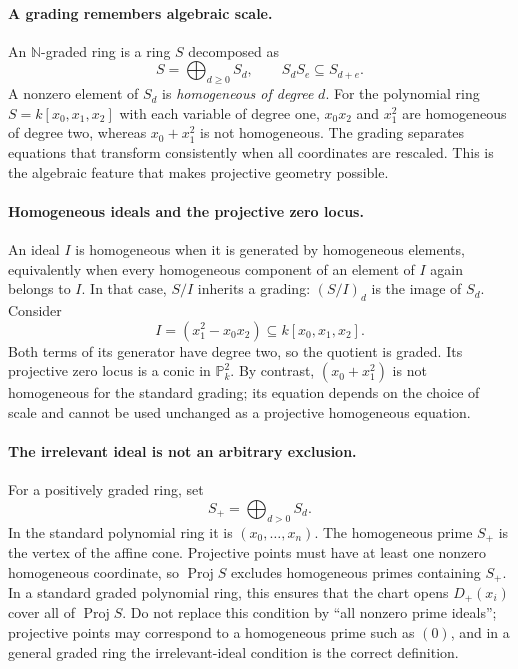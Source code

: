 \paragraph{A grading remembers algebraic scale.}
An \(\mathbb N\)-graded ring is a ring \(S\) decomposed as
\[
 S=\bigoplus_{d\geq 0} S_d,\qquad S_dS_e\subseteq S_{d+e}.
\]
A nonzero element of \(S_d\) is \emph{homogeneous of degree} \(d\).
For the polynomial ring \(S=k[x_0,x_1,x_2]\) with each variable of
degree one, \(x_0x_2\) and \(x_1^2\) are homogeneous of degree two,
whereas \(x_0+x_1^2\) is not homogeneous. The grading separates
equations that transform consistently when all coordinates are
rescaled. This is the algebraic feature that makes projective geometry
possible.

\paragraph{Homogeneous ideals and the projective zero locus.}
An ideal \(I\) is homogeneous when it is generated by homogeneous
elements, equivalently when every homogeneous component of an element
of \(I\) again belongs to \(I\). In that case, \(S/I\) inherits a
grading: \((S/I)_d\) is the image of \(S_d\). Consider
\[
 I=(x_1^2-x_0x_2)\subseteq k[x_0,x_1,x_2].
\]
Both terms of its generator have degree two, so the quotient is
graded. Its projective zero locus is a conic in \(\mathbb P^2_k\).
By contrast, \((x_0+x_1^2)\) is not homogeneous for the standard
grading; its equation depends on the choice of scale and cannot
be used unchanged as a projective homogeneous equation.

\paragraph{The irrelevant ideal is not an arbitrary exclusion.}
For a positively graded ring, set
\[
 S_+=\bigoplus_{d>0}S_d.
\]
In the standard polynomial ring it is \((x_0,\ldots,x_n)\).
The homogeneous prime \(S_+\) is the vertex of the affine cone.
Projective points must have at least one nonzero homogeneous coordinate,
so \(\operatorname{Proj}S\) excludes homogeneous primes containing
\(S_+\). In a standard graded polynomial ring, this ensures that
the chart opens \(D_+(x_i)\) cover all of \(\operatorname{Proj}S\).
Do not replace this condition by ``all nonzero prime ideals'';
projective points may correspond to a homogeneous prime such as
\((0)\), and in a general graded ring the irrelevant-ideal condition
is the correct definition.


